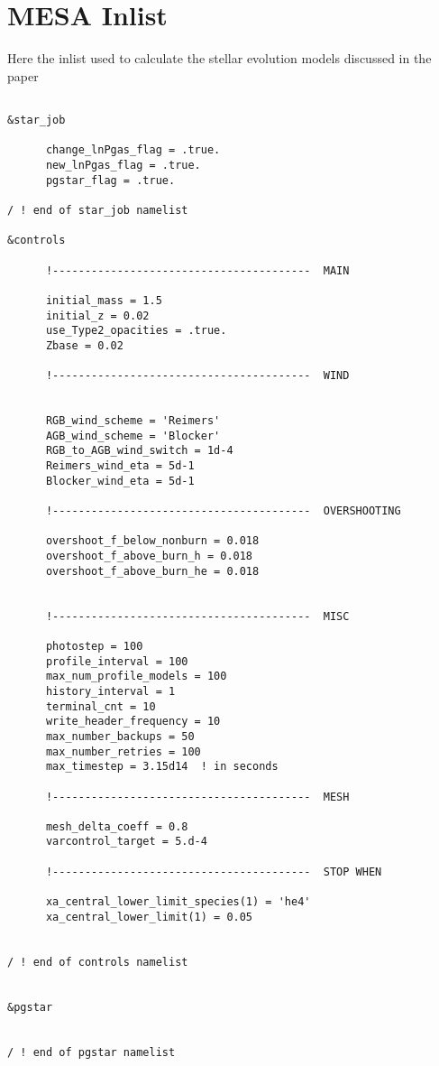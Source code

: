
\section{MESA Inlist}
\label{inlist}

Here the inlist used to calculate the stellar evolution models discussed in the paper
\begin{verbatim}

&star_job
            
      change_lnPgas_flag = .true.
      new_lnPgas_flag = .true.
      pgstar_flag = .true.

/ ! end of star_job namelist

&controls
      
      !----------------------------------------  MAIN
       
      initial_mass = 1.5
      initial_z = 0.02
      use_Type2_opacities = .true.
      Zbase = 0.02  
      
      !----------------------------------------  WIND


      RGB_wind_scheme = 'Reimers'
      AGB_wind_scheme = 'Blocker'
      RGB_to_AGB_wind_switch = 1d-4
      Reimers_wind_eta = 5d-1  
      Blocker_wind_eta = 5d-1  

      !----------------------------------------  OVERSHOOTING

      overshoot_f_below_nonburn = 0.018
      overshoot_f_above_burn_h = 0.018
      overshoot_f_above_burn_he = 0.018


      !----------------------------------------  MISC

      photostep = 100
      profile_interval = 100
      max_num_profile_models = 100
      history_interval = 1
      terminal_cnt = 10
      write_header_frequency = 10
      max_number_backups = 50
      max_number_retries = 100
      max_timestep = 3.15d14  ! in seconds  

      !----------------------------------------  MESH      

      mesh_delta_coeff = 0.8
      varcontrol_target = 5.d-4
      
      !----------------------------------------  STOP WHEN

      xa_central_lower_limit_species(1) = 'he4'
      xa_central_lower_limit(1) = 0.05
      

/ ! end of controls namelist


&pgstar
        

/ ! end of pgstar namelist



\end{verbatim}
